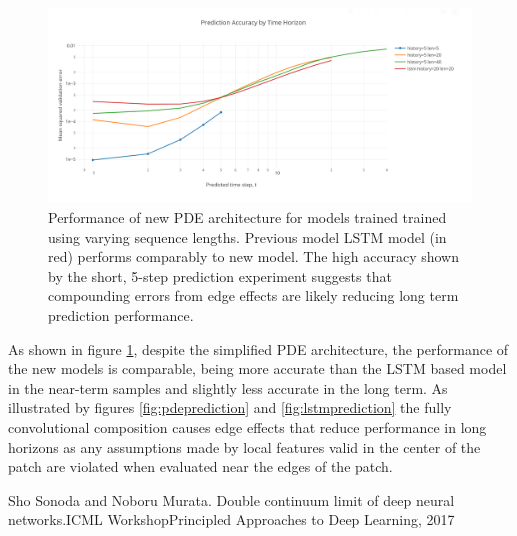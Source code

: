 \documentclass[12pt]{article}
\theoremstyle{plain}
\theoremstyle{remark}
\theoremstyle{definition}
\begin{document}
\begin{figure}
	\centering
	\includegraphics[width=0.9\linewidth]{pde_perf}
	\caption{\small Performance of new PDE architecture for models trained trained using varying sequence lengths. Previous model LSTM model (in red) performs comparably to new model. The high accuracy shown by the short, 5-step prediction experiment suggests that compounding errors from edge effects are likely reducing long term prediction performance.}
	\label{fig:pdeperf}
\end{figure}

As shown in figure \ref{fig:pdeperf}, despite the simplified PDE architecture, the performance of the new models is comparable, being more accurate than the LSTM based model in the near-term samples and slightly less accurate in the long term. As illustrated by figures \ref{fig:pdeprediction} and \ref{fig:lstmprediction} the fully convolutional composition causes edge effects that reduce performance in long horizons as any assumptions made by local features valid in the center of the patch are violated when evaluated near the edges of the patch.



Sho Sonoda and Noboru Murata. Double continuum limit of deep neural networks.ICML WorkshopPrincipled Approaches to Deep Learning, 2017
\end{document}
